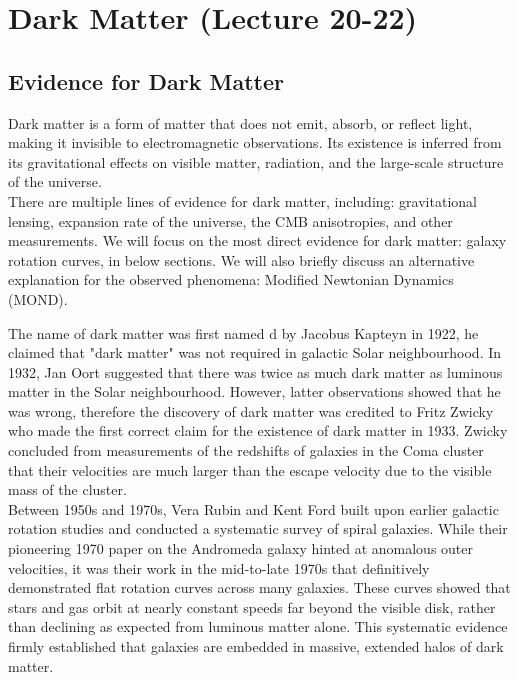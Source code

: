 
\chapter{Dark Matter (Lecture 20-22)}

\section{Evidence for Dark Matter}
\begin{intuition}
    Dark matter is a form of matter that does not emit, absorb, or reflect light, making it invisible to electromagnetic observations. Its existence is inferred from its gravitational effects on visible matter, radiation, and the large-scale structure of the universe. \\

    There are multiple lines of evidence for dark matter, including: gravitational lensing, expansion rate of the universe, the CMB anisotropies, and other measurements. We will focus on the most direct evidence for dark matter: galaxy rotation curves, in below sections. We will also briefly discuss an alternative explanation for the observed phenomena: Modified Newtonian Dynamics (MOND).
\end{intuition}

\bigskip \noindent
\begin{extra}
    The name of dark matter was first named d by Jacobus Kapteyn in 1922, he claimed that "dark matter" was not required in galactic Solar neighbourhood. In 1932, Jan Oort suggested that there was twice as much dark matter as luminous matter in the Solar neighbourhood. However, latter observations showed that he was wrong, therefore the discovery of dark matter was credited to Fritz Zwicky who made the first correct claim for the existence of dark matter in 1933. Zwicky concluded from measurements of the redshifts of galaxies in the Coma cluster that their velocities are much larger than the escape velocity due to the visible mass of the cluster. \\

    Between 1950s and 1970s, Vera Rubin and Kent Ford built upon earlier galactic rotation studies and conducted a systematic survey of spiral galaxies.  While their pioneering 1970 paper on the Andromeda galaxy hinted at anomalous outer velocities, it was their work in the mid-to-late 1970s that definitively demonstrated flat rotation curves across many galaxies. These curves showed that stars and gas orbit at nearly constant speeds far beyond the visible disk, rather than declining as expected from luminous matter alone. This systematic evidence firmly established that galaxies are embedded in massive, extended halos of dark matter.
\end{extra}

